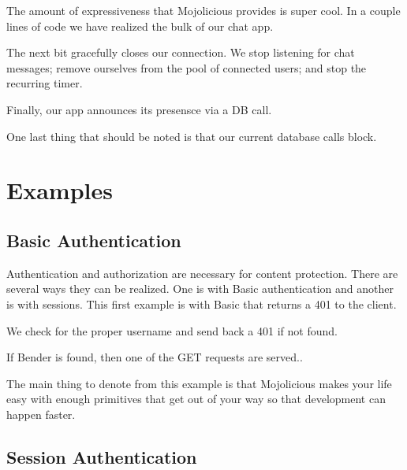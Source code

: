 \documentclass[14pt]{extreport}
\begin{document}
The amount of expressiveness that Mojolicious provides is super cool.  In a
couple lines of code we have realized the bulk of our chat app.

The next bit gracefully closes our connection.  We stop listening for chat
messages; remove ourselves from the pool of connected users; and stop the
recurring timer.



Finally, our app announces its presensce via a DB call.



One last thing that should be noted is that our current database calls block.

\chapter*{Examples}

\section{Basic Authentication}

Authentication and authorization are necessary for content protection.  There
are several ways they can be realized.  One is with Basic authentication and
another is with sessions.  This first example is with Basic that returns a 401
to the client.

We check for the proper username and send back a 401 if not found.



\clearpage

If Bender is found, then one of the GET requests are served..



The main thing to denote from this example is that Mojolicious makes your life
easy with enough primitives that get out of your way so that development can happen 
faster.

\section{Session Authentication}
\end{document}
